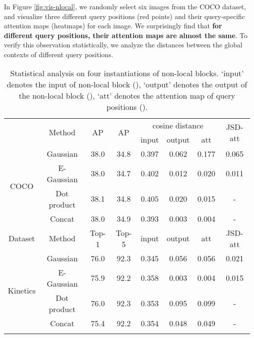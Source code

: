 \documentclass[10pt,twocolumn,letterpaper]{article}
\begin{document}
In Figure \ref{fig:vis-nlocal}, we randomly select six images from the COCO dataset, and visualize three different query positions (red points) and their query-specific attention maps (heatmaps) for each image. 
We surprisingly find that \textbf{for different query positions, their attention maps are almost the same}.
To verify this observation statistically, we analyze the distances between the global contexts of different query positions.

\begin{table}[]
    \centering
    \addtolength{\tabcolsep}{-3.5pt}
    \footnotesize
\begin{tabular}{c|c|cc|ccc|c}
\Xhline{1.0pt}
\multirow{2}{*}{Dataset} & \multirow{2}{*}{Method} & \multirow{2}{*}{AP} & \multirow{2}{*}{AP}  & \multicolumn{3}{c|}{cosine distance} & \multirow{2}{*}{JSD-att} \\
\cline{5-7}
 &  &  &  & input & output  & att & \\
\hline
\multirow{4}{30pt}{\centering COCO} & Gaussian &  38.0 & 34.8 & 0.397 & 0.062 & 0.177 & 0.065 \\
 & E-Gaussian & 38.0 & 34.7 & 0.402 & 0.012 & 0.020 & 0.011 \\
 & Dot product &  38.1 & 34.8 & 0.405 & 0.020 & 0.015 & - \\
 & Concat &  38.0 & 34.9 & 0.393 & 0.003 & 0.004 & - \\
 \hline
Dataset & Method & Top-1 & Top-5   & input & output  & att & JSD-att \\
 \hline
\multirow{4}{30pt}{\centering Kinetics} & Gaussian & 76.0 & 92.3 & 0.345 & 0.056 & 0.056 & 0.021 \\
 & E-Gaussian & 75.9 & 92.2 & 0.358 & 0.003 & 0.004 & 0.015 \\
 & Dot product & 76.0 & 92.3 & 0.353 & 0.095 & 0.099 & - \\
 & Concat & 75.4 & 92.2 & 0.354 & 0.048 & 0.049 & - \\
\Xhline{1.0pt}
\end{tabular}
	\vspace{-5pt}
    \caption{Statistical analysis on four instantiations of non-local blocks. `input' denotes the input of non-local block (), `output' denotes the output of the non-local block (), `att' denotes the attention map of query positions ().}
\label{table:statistical-nlocal}
	\vspace{-10pt}
\end{table}


\vspace{-12pt}
\end{document}
